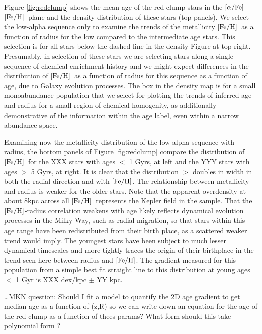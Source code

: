 \documentclass[12pt, preprint]{aastex}
\newcommand{\feh}{\mbox{$\rm [Fe/H]$}}
\newcommand{\alphafe}{\mbox{$\rm [\alpha/Fe]$}}
\begin{document}
Figure \ref{fig:redclump} shows the mean age of the red clump stars in the \alphafe-\feh\ plane and the density distribution of these stars (top panels).  We select the low-alpha sequence only to examine the trends of the metallicity \feh\ as a function of radius for the low compared to the intermediate age stars. This selection is for all stars below the dashed line in the density Figure at top right. Presumably, in selection of these stars we are selecting stars along a single sequence of chemical enrichment history and we might expect differences in the distribution of \feh\ as a function of radius for this sequence as a function of age, due to Galaxy evolution processes. The box in the density map is for a small monoabundance population that we select for plotting the trends of inferred age and radius for a small region of chemical homogenity, as additionally demonstrative of the information within the age label, even within a narrow abundance space. 

Examining now the metallicity distribution of the low-alpha sequence with radius, the bottom panels of Figure \ref{fig:redclump} compare the distribution of \feh\ for the XXX stars with ages $<$ 1 Gyrs, at left and the YYY stars with ages $>$ 5 Gyrs, at right. It is clear that the distribution $>$ doubles in width in both the radial direction and with \feh. The relationship between metallicity and radius is weaker for the older stars. Note that the apparent overdensity at about 8kpc across all \feh\ represents the Kepler field in the sample. That the \feh-radius correlation weakens with age likely reflects dynamical evolution processes in the Milky Way, such as radial migration, so that stars within this age range have been redistributed from their birth place, as a scattered weaker trend would imply. The youngest stars have been subject to much lesser dynamical timescales and more tightly traces the origin of their birthplace in the trend seen here between radius and \feh. The gradient measured for this population from a simple best fit straight line to this distribution at young ages $<$ 1 Gyr is XXX dex/kpc $\pm$ YY kpc. 

\ldots MKN question: Should I fit a model to quantify the 2D age gradient to get median age as a function of (z,R) so we can write down an equation for the age of the red clump as a function of thees params? What form should this take - polynomial form ? 

\end{document}
